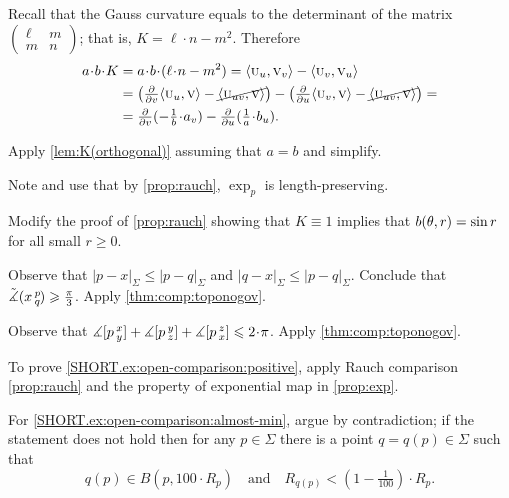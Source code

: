 Recall that the Gauss curvature equals to the determinant of the matrix $
(\begin{smallmatrix}
\ell&m
\\
m&n
\end{smallmatrix}
)
$;
that is, $K=\ell\cdot n-m^2$.
Therefore 
\begin{align*}
a\cdot b\cdot K
&=
a\cdot b\cdot(\ell\cdot n-m^2)
=
\langle\vec u_u,\vec v_v\rangle 
-
\langle\vec u_v,\vec v_u\rangle
\\
&= 
\left(
\tfrac{\partial}{\partial v}
\langle\vec u_u,\vec v\rangle
-
\cancel{\langle\vec u_{uv},\vec v\rangle}
\right)-
\left(
\tfrac{\partial}{\partial u}
\langle\vec u_v,\vec v\rangle
-
\cancel{\langle\vec u_{uv},\vec v\rangle}
\right)=
\\
&=\tfrac{\partial}{\partial v}(-\tfrac1{b}\cdot a_v)
-
\tfrac{\partial}{\partial u}(\tfrac1{a}\cdot b_u).
\end{align*}

 Apply \ref{lem:K(orthogonal)} assuming that $a=b$ and simplify.

 Note and use that by \ref{prop:rauch}, $\exp_p$ is length-preserving.

{

 Modify the proof of \ref{prop:rauch} showing that $K\equiv 1$ implies that $b(\theta,r)\z=\sin r$ for all small $r\ge 0$.

}













\setcounter{eqtn}{0}

Observe that $|p-x|_\Sigma\le |p-q|_\Sigma$ and $|q-x|_\Sigma\le |p-q|_\Sigma$.
Conclude that $\tilde\measuredangle(x\,{}^{p}_{q}\hspace{-0.2ex})\geqslant \tfrac\pi3$.
Apply \ref{thm:comp:toponogov}.

Observe that 
$\measuredangle\hinge pxy+\measuredangle\hinge pyz+\measuredangle\hinge pzx\le2\cdot \pi$.
Apply \ref{thm:comp:toponogov}.

 To prove \ref{SHORT.ex:open-comparison:positive}, apply Rauch comparison \ref{prop:rauch} and the property of exponential map in \ref{prop:exp}.

For \ref{SHORT.ex:open-comparison:almost-min}, argue by contradiction;
if the statement does not hold then for any $p\in\Sigma$ there is a point $q=q(p)\in \Sigma$ such that 
\[
q(p)\in B(p,100\cdot R_p)
\quad\text{and}\quad
R_{q(p)}<(1-\tfrac1{100})\cdot R_p.
\]

